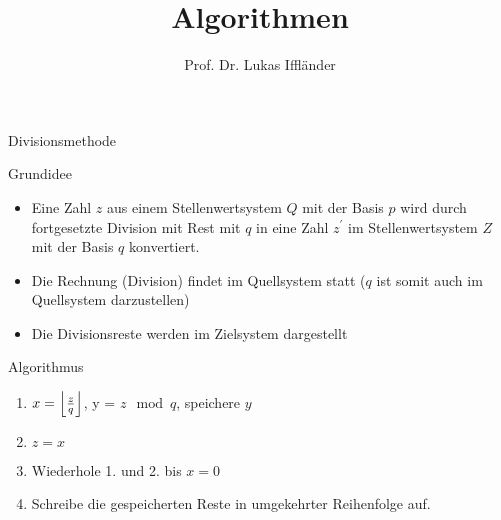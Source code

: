 \documentclass[xelatex,aspectratio=169]{beamer}
\title{Algorithmen}
\author{Prof. Dr. Lukas Iffländer}
\institute{HTW Dresden}
\date{}
\begin{document}
\begin{frame}{Divisionsmethode}
    \begin{block}{Grundidee}
        \begin{itemize}
            \item Eine Zahl $z$ aus einem Stellenwertsystem $Q$ mit der Basis $p$ wird durch fortgesetzte Division mit Rest mit $q$ in eine Zahl $z^{'}$ im Stellenwertsystem $Z$ mit der Basis $q$ konvertiert.
            \item Die Rechnung (Division) findet im Quellsystem statt ($q$ ist somit auch im Quellsystem darzustellen)
            \item Die Divisionsreste werden im Zielsystem dargestellt
        \end{itemize}
    \end{block}
    \begin{block}{Algorithmus}
        \begin{enumerate}
            \item $x = \floor*{\frac{z}{q}}$, y = $z \mod q$, speichere $y$
            \item $z = x$
            \item Wiederhole 1. und 2. bis $x = 0$
            \item Schreibe die gespeicherten Reste in umgekehrter Reihenfolge auf.
        \end{enumerate}

    \end{block}

\end{frame}
\end{document}

